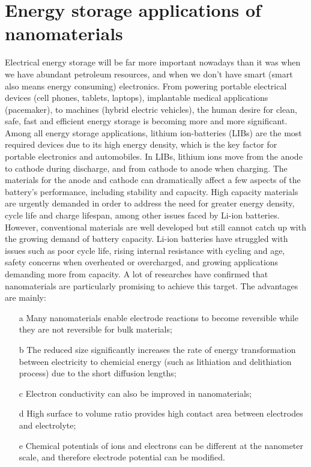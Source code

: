 \section{Energy storage applications of nanomaterials}
Electrical energy storage will be far more important nowadays than it was when we have abundant petroleum resources, and when we don't have smart (smart also means energy consuming) electronics. From powering portable electrical devices (cell phones, tablets, laptops), implantable medical applications (pacemaker), to machines (hybrid electric vehicles), the human desire for clean, safe, fast and efficient energy storage is becoming more and more  significant. \\
Among all energy storage applications, lithium ion-batteries (LIBs) are the most required devices due to its high energy density, which is the key factor for portable electronics and automobiles. In LIBs, lithium ions move from the anode to cathode during discharge, and from cathode to anode when charging. The materials for the anode and cathode can dramatically affect a few aspects of the battery’s performance, including stability and capacity. High capacity materials are urgently demanded in order to address the need for greater energy density, cycle life and charge lifespan, among other issues faced by Li-ion batteries. 
However, conventional materials are well developed but still cannot catch up with the growing demand of battery capacity. Li-ion batteries have struggled with issues such as poor cycle life, rising internal resistance with cycling and age, safety concerns when overheated or overcharged, and growing applications demanding more from capacity. A lot of researches have confirmed that nanomaterials are particularly promising to achieve this target. The advantages are mainly\cite{Bruce2008,qifengzhang2013csr}: \\
\begin{itemize}
	\item[a] Many nanomaterials enable electrode reactions to become reversible while they are not reversible for bulk materials; 
	\item[b] The reduced size significantly increases the rate of energy transformation between electricity to chemicial energy (such as lithiation and delithiation process) due to the short diffusion lengths; 
	\item[c] Electron conductivity can also be improved in nanomaterials; 
	\item[d] High surface to volume ratio provides high contact area between electrodes and electrolyte; 
	\item[e] Chemical potentials of ions and electrons can be different at the nanometer scale, and therefore electrode potential can be modified. 
\end{itemize}

